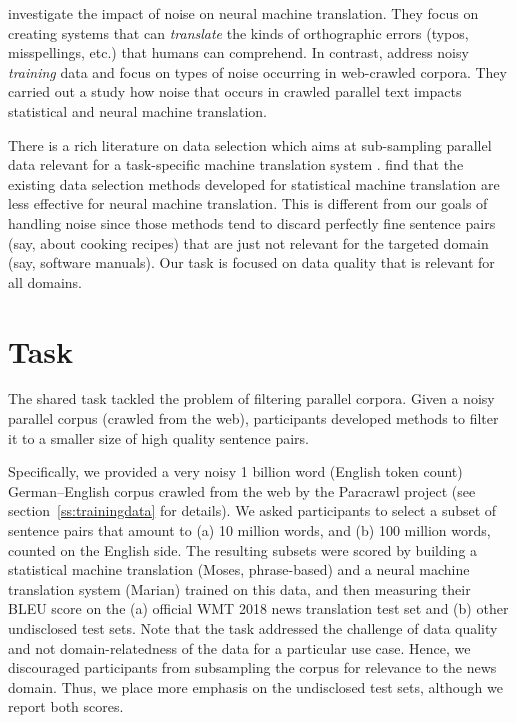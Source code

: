 \documentclass[11pt,a4paper]{article}
\begin{document}
\citet{Belinkov:Bisk:noise} investigate the impact of noise on neural machine translation. They focus on creating systems that can {\em translate}  the kinds of orthographic errors (typos, misspellings, etc.) that humans can comprehend. In contrast, \citet{W18-2709} address noisy {\em training} data and focus on types of noise occurring in web-crawled corpora. They carried out a study how noise that occurs in crawled parallel text impacts statistical and neural machine translation. 

There is a rich literature on data selection which aims at sub-sampling parallel data relevant for a task-specific machine translation system \citep{axelrod-he-gao:2011:EMNLP}. \citet{D17-1148} find that the existing data selection methods developed for statistical machine translation  are less effective for neural machine translation. This is different from our goals of handling noise since those methods tend to discard perfectly fine sentence pairs (say, about cooking recipes) that are just not relevant for the targeted domain (say, software manuals). Our task is focused on data quality that is relevant for all domains.  

\section{Task}
The shared task tackled the problem of filtering parallel corpora. Given a noisy parallel corpus (crawled from the web), participants developed methods to filter it to a smaller size of high quality sentence pairs.

Specifically, we provided a very noisy 1 billion word (English token count) German--English corpus crawled from the web by the Paracrawl project (see section~\ref{ss:trainingdata} for details). We asked participants to select a subset of sentence pairs that amount to (a) 10 million words, and (b) 100 million words, counted on the English side. The resulting subsets were scored by building a statistical machine translation (Moses, phrase-based) and a neural machine translation system (Marian) trained on this data, and then measuring their BLEU score on the (a) official WMT 2018 news translation test set and (b) other undisclosed test sets.
%
Note that the task addressed the challenge of data quality and not domain-relatedness of the data for a particular use case. Hence, we discouraged participants from subsampling the corpus for relevance to the news domain. Thus, we place more emphasis on the undisclosed test sets, although we report both scores.
\end{document}

